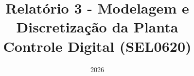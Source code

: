 \documentclass[11pt]{article}
\title{Relatório 3 - Modelagem e Discretização da Planta\\\small{Controle Digital (SEL0620)}}
\date{2026}
\begin{document}

\makeatletter







%
\end{document}
